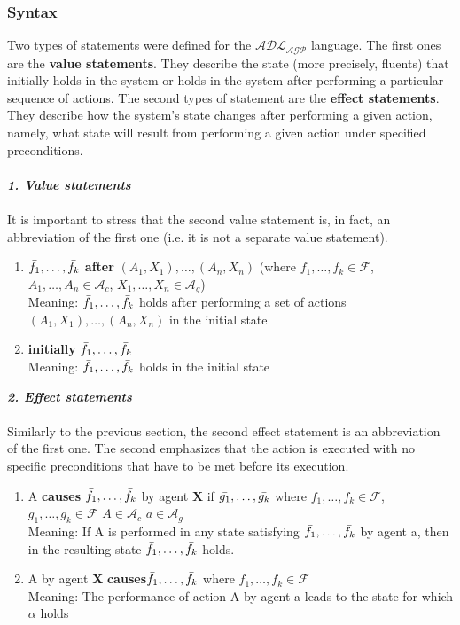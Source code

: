 \documentclass[a4paper]{article}
\begin{document}
\subsubsection{Syntax} \label{statements}
%
Two types of statements were defined for the $\mathcal{ADL_{AGP}}$ language. The first ones are the \textbf{value statements}. They describe the state (more precisely, fluents) that initially holds in the system or holds in the system after performing a particular sequence of actions. The second types of statement are the \textbf{effect statements}. They describe how the system's state changes after performing a given action, namely, what state will result from performing a given action under specified preconditions.
\\ \\
\textbf{\textit{1. Value statements}}
\\ \\
It is important to stress that the second value statement is, in fact, an abbreviation of the first one (i.e. it is not a separate value statement).
\begin{enumerate}
  \item $\Bar{f_1},\dotsc,\Bar{f_k}$ \textbf{after} $(A_1, X_1),\dotsc,(A_n, X_n)$ (where $f_1,\dotsc,f_k\in\mathcal{F}$, $A_1,\dotsc,A_n \in \mathcal{A}_c$, $X_1,\dotsc,X_n \in \mathcal{A}_g$) \\[0.5\baselineskip]
    Meaning: $\Bar{f_1},\dotsc,\Bar{f_k}$ holds after performing a set of actions $(A_1, X_1),\dotsc,(A_n, X_n)$ in the initial state
    \item \textbf{initially} $\Bar{f_1},\dotsc,\Bar{f_k}$ \\[0.5\baselineskip]
    Meaning: $\Bar{f_1},\dotsc,\Bar{f_k}$ holds in the initial state
\end{enumerate}
\textbf{\textit{2. Effect statements}}
\\ \\
Similarly to the previous section, the second effect statement is an abbreviation of the first one. 
The second emphasizes that the action is executed with no specific preconditions that have to be met before its execution.
\begin{enumerate}
  \item A \textbf{causes} $\Bar{f_1},\dotsc,\Bar{f_k}$ by agent \textbf{X} if $\Bar{g_1},\dotsc,\Bar{g_k}$ where $f_1,\dotsc,f_k\in\mathcal{F}$, $g_1,\dotsc,g_k\in\mathcal{F}$ $A\in\mathcal{A}_c$ $a\in\mathcal{A}_g$\\[0.5\baselineskip]
    Meaning: If A is performed in any state satisfying $\Bar{f_1},\dotsc,\Bar{f_k}$ by agent a, then in the resulting state $\Bar{f_1},\dotsc,\Bar{f_k}$ holds. 
    \item A by agent \textbf{X} \textbf{causes}$\Bar{f_1},\dotsc,\Bar{f_k}$ where $f_1,\dotsc,f_k\in\mathcal{F}$\\[0.5\baselineskip]
    Meaning: The performance of action A by agent a leads to the state for which $\alpha$ holds 
\end{enumerate}
%
\end{document}
